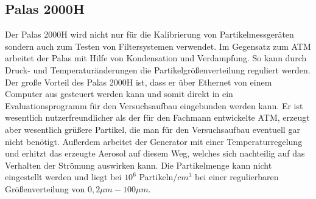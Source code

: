 \subsection{Palas 2000H}
Der Palas 2000H wird nicht nur f\"{u}r die Kalibrierung von Partikelmessger\"{a}ten sondern auch zum Testen von Filtersystemen verwendet. Im Gegensatz zum ATM arbeitet der Palas mit Hilfe von Kondensation und Verdampfung. So kann durch Druck- und Temperatur\"{a}nderungen die Partikelgr\"{o}{\ss}enverteilung reguliert werden. Der gro{\ss}e Vorteil des Palas 2000H ist, dass er \"{u}ber Ethernet von einem Computer aus gesteuert werden kann und somit direkt in ein Evaluationsprogramm f\"{u}r den Versuchsaufbau eingebunden werden kann. Er ist wesentlich nutzerfreundlicher als der f\"{u}r den Fachmann entwickelte ATM, erzeugt aber wesentlich gr\"{u}{\ss}ere Partikel, die man f\"{u}r den Versuchsaufbau eventuell gar nicht ben\"{o}tigt. Au{\ss}erdem arbeitet der Generator mit einer Temperaturregelung und erhitzt das erzeugte Aerosol auf diesem Weg, welches sich nachteilig auf das Verhalten der Str\"{o}mung auswirken kann. Die Partikelmenge kann nicht eingestellt werden und liegt bei \(10^6\) Partikeln\(/cm^3\) bei einer regulierbaren Gr\"{o}{\ss}enverteilung von \(0,2 \mu m - 100\mu m\).\cite{palas}